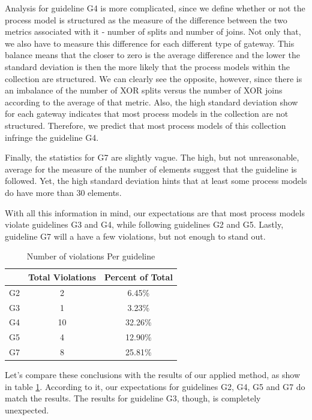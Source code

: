 \documentclass[a4paper,twoside]{article}
\begin{document}
Analysis for guideline G4 is more complicated, since we define whether or not the process model is structured as the measure of the difference between the two metrics associated with it - number of splits and number of joins. Not only that, we also have to measure this difference for each different type of gateway. This balance means that the closer to zero is the average difference and the lower the standard deviation is then the more likely that the process models within the collection are structured.  We can clearly see the opposite, however, since there is an imbalance of the number of XOR splits versus the number of XOR joins according to the average of that metric. Also, the high standard deviation show for each gateway indicates that most process models in the collection are not structured. Therefore, we predict that most process models of this collection infringe the guideline G4.

Finally, the statistics for G7 are slightly vague. The high, but not unreasonable, average for the measure of the number of elements suggest that the guideline is followed. Yet, the high standard deviation hints that at least some process models do have more than 30 elements.

With all this information in mind, our expectations are that most process models violate guidelines G3 and G4, while following guidelines G2 and G5. Lastly, guideline G7 will a have a few violations, but not enough to stand out.

\begin{table}[]
	\centering
	\caption{Number of violations Per guideline}
	\label{ViolationsPerGuideline}
	\begin{tabular}{|c|c|c|}
		\hline
		& Total Violations & Percent of Total \\ \hline
		G2 & 2 & 6.45\% \\ \hline
		G3 & 1 & 3.23\% \\ \hline
		G4 & 10 & 32.26\% \\ \hline %
		G5 & 4 & 12.90\% \\ \hline
		G7 & 8 & 25.81\% \\ \hline
	\end{tabular}
\end{table}

Let's compare these conclusions with the results of our applied method, as show in table \ref{ViolationsPerGuideline}. According to it, our expectations for guidelines G2, G4, G5 and G7 do match the results. The results for guideline G3, though, is completely unexpected. 
\end{document}
